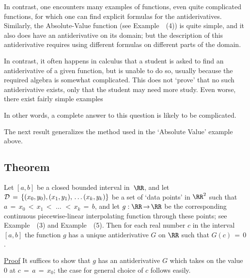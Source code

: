 {        In contrast, one encounters many examples of functions, even quite complicated functions,
    for which one can find explicit formulas for the antiderivatives.
    Similarly, the Absolute-Value function (see Example~~(4)) is quite simple, and it also does have an antiderivative on its domain;
    but the description of this antiderivative requires using different formulas on different parts of the domain.

        In contrast, it often happens in calculus that a student is asked to find an antiderivative of a given function,
    but is unable to do so, usually because the required algebra is somewhat complicated.
    This does not `prove' that no such antiderivative exists, only that the student may need more study.
    Even worse, there exist fairly simple examples


    In other words, a complete answer to this question is likely to be complicated.

\V

        The next result generalizes the method used in the `Absolute Value' example above.

\V

             \subsection{\small{\bf Theorem}}
            \label{ThmE45.125A}

\V

        Let $[a,b]$ be a closed bounded interval in~${\RR}$, and let ${\cal D} \,=\, \{(x_{0},y_{0}), (x_{1},y_{1}),\,{\ldots}\,(x_{k},y_{k})\}$
    be a set of `data points' in ${\RR}^{2}$ such that $a \,=\, x_{0}\,<\,x_{1}\,<\,\,{\ldots}\,\,<\,x_{k} \,=\, b$,
    and let $g:{\RR} \,{\rightarrow}\, {\RR}$ be the corresponding continuous piecewise-linear interpolating function through these points;
    see Example~~(3) and Example~~(5). Then for each real number $c$ in the interval $[a,b]$
    the function $g$ has a unique antiderivative $G$ on ${\RR}$ such that $G(c) \,=\, 0$.

\V

        \underline{Proof} It suffices to show that $g$ has an antiderivative $G$ which takes on the value $0$ at $c \,=\, a \,=\, x_{0}$;
    the case for general choice of $c$ follows easily.

}
